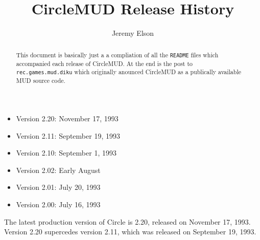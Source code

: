 \documentclass[11pt]{article}
\title{CircleMUD Release History}
\author{Jeremy Elson}
\begin{document}
\maketitle

\begin{abstract}
This document is basically just a a compliation of all the \texttt{README} files which accompanied each release of CircleMUD.  At the end is the post to \texttt{rec.games.mud.diku} which originally anounced CircleMUD as a publically available MUD source code.
\end{abstract}

\begin{itemize}
\item Version 2.20:  November 17, 1993
\item Version 2.11:  September 19, 1993
\item Version 2.10:  September 1, 1993
\item Version 2.02:  Early August
\item Version 2.01:  July 20, 1993
\item Version 2.00:  July 16, 1993
\end{itemize}

The latest production version of Circle is 2.20, released on November 17, 1993.  Version 2.20 supercedes version 2.11, which was released on September 19, 1993.
\end{document}
